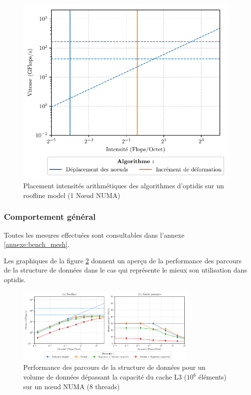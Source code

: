 \begin{figure}
    \centering
    \includegraphics[width=.4\textwidth]{img/bench_mesh_roofline_algos.pdf}
    \caption{ Placement intensités arithmétiques des algorithmes d'optidis sur un roofline model (1 Nœud NUMA) }
    \label{fig:roofline_algos}
\end{figure}



\subsubsection{Comportement général}

Toutes les mesures effectuées sont consultables dans l'annexe \ref{annexe:bench_mesh}.

Les graphiques de la figure \ref{fig:bench_mesh_comportement_general} donnent un aperçu de la performance des parcours de la structure de données dans le cas qui représente le mieux son utilisation dans optidis. 

\begin{figure}
    \centering
    \includegraphics[width=0.8\textwidth]{img/bench_mesh_omp.pdf}
    \caption{Performance des parcours de la structure de données pour un volume de données dépassant la capacité du cache L3 ($10^6$ éléments) sur un nœud NUMA (8 threads)}
    \label{fig:bench_mesh_comportement_general}
\end{figure}

